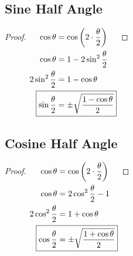 \documentclass{article}
\begin{document}
\subsection{Sine Half Angle}
\label{proof:sinhalf}
\begin{proof}
	$\begin{aligned}[t]
		\cos\theta&=\cos\left(2\cdot\frac{\theta}{2}\right) \\
		\cos\theta&=1-2\sin^2\frac{\theta}{2} \\
		2\sin^2\frac{\theta}{2}&=1-\cos\theta \\
		\Aboxed{\sin\frac{\theta}{2}&=\pm\sqrt{\frac{1-\cos\theta}{2}}} \\
	\end{aligned} \\$
\end{proof}

\subsection{Cosine Half Angle}
\label{proof:coshalf}
\begin{proof}
	$\begin{aligned}[t]
		\cos\theta&=\cos\left(2\cdot\frac{\theta}{2}\right) \\
		\cos\theta&=2\cos^2\frac{\theta}{2}-1 \\
		2\cos^2\frac{\theta}{2}&=1+\cos\theta \\
		\Aboxed{\cos\frac{\theta}{2}&=\pm\sqrt{\frac{1+\cos\theta}{2}}} \\
	\end{aligned} \\$
\end{proof}
\end{document}
